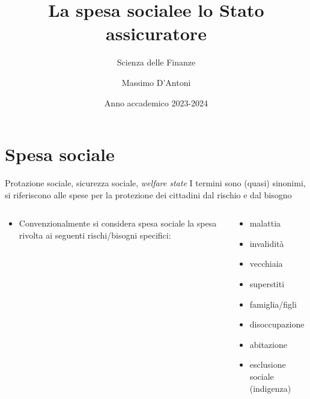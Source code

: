 \documentclass[aspectratio=64,11pt]{beamer}
\institute{Università di Siena}
\author{Massimo D'Antoni}
\date{Anno accademico 2023-2024}
\title{La spesa sociale\newline e lo Stato assicuratore}
\subtitle{Scienza delle Finanze}
\begin{document}
\maketitle

\section{Spesa sociale}

\begin{frame}{Protazione sociale, sicurezza sociale, \emph{welfare state}}
I termini sono (quasi) sinonimi, si riferiscono alle spese per la protezione
dei cittadini dal rischio e dal bisogno
\vspace{-3mm}

\begin{columns}
\begin{column}[t]{0.4\columnwidth}
\begin{itemize}
\item Convenzionalmente si considera spesa sociale la spesa rivolta ai seguenti rischi/bisogni specifici:
\end{itemize}
\end{column}

\begin{column}[t]{.58\columnwidth}
\begin{itemize}
\item malattia
\item invalidità
\item vecchiaia
\item superstiti
\item famiglia/figli
\item disoccupazione
\item abitazione
\item esclusione sociale (indigenza)
\end{itemize}
\end{column}
\end{columns}
\end{frame}
\end{document}
